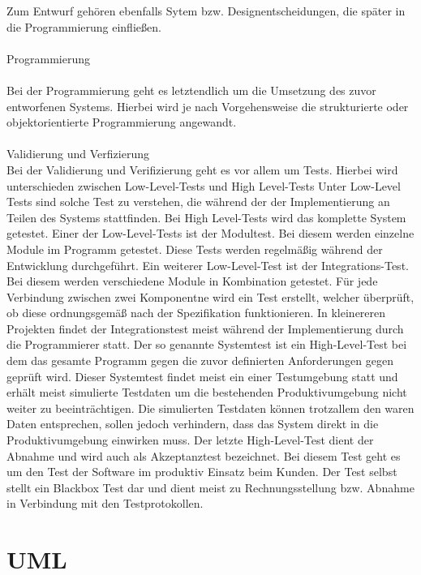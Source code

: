 Zum Entwurf gehören ebenfalls Sytem bzw. Designentscheidungen, die später in die Programmierung einfließen.
\\
\\
Programmierung\\
\\
Bei der Programmierung geht es letztendlich um die Umsetzung des zuvor entworfenen Systems. Hierbei wird je nach Vorgehensweise die strukturierte oder objektorientierte Programmierung angewandt.
\\
\\
Validierung und Verfizierung
\\
Bei der Validierung  und Verifizierung geht es vor allem um Tests. Hierbei wird unterschieden zwischen Low-Level-Tests und High Level-Tests Unter Low-Level Tests sind solche Test zu verstehen, die während der der Implementierung an Teilen des Systems stattfinden. Bei High Level-Tests wird das komplette System getestet. Einer der Low-Level-Tests ist der Modultest. Bei diesem werden einzelne Module im Programm getestet.  Diese Tests werden regelmäßig während der Entwicklung durchgeführt. Ein weiterer Low-Level-Test ist der Integrations-Test. Bei diesem werden verschiedene Module in Kombination getestet. Für jede Verbindung zwischen zwei Komponentne wird ein Test erstellt, welcher überprüft, ob diese ordnungsgemäß nach der Spezifikation funktionieren. In kleinereren Projekten findet der Integrationstest meist während der Implementierung durch die Programmierer statt.
Der so genannte Systemtest ist ein High-Level-Test bei dem das gesamte Programm gegen die zuvor definierten Anforderungen gegen geprüft wird. Dieser Systemtest findet meist ein einer Testumgebung statt und erhält meist simulierte Testdaten um die bestehenden Produktivumgebung nicht weiter zu beeinträchtigen. Die simulierten Testdaten können trotzallem den waren Daten entsprechen, sollen jedoch verhindern, dass das System direkt in die Produktivumgebung einwirken muss.
Der letzte High-Level-Test dient der Abnahme und wird auch als Akzeptanztest bezeichnet. Bei diesem Test geht es um den Test der Software im produktiv Einsatz beim Kunden. Der Test selbst stellt ein Blackbox Test dar und dient meist zu Rechnungsstellung bzw. Abnahme in Verbindung mit den Testprotokollen.

\section{UML}
\label{sec:uml}

